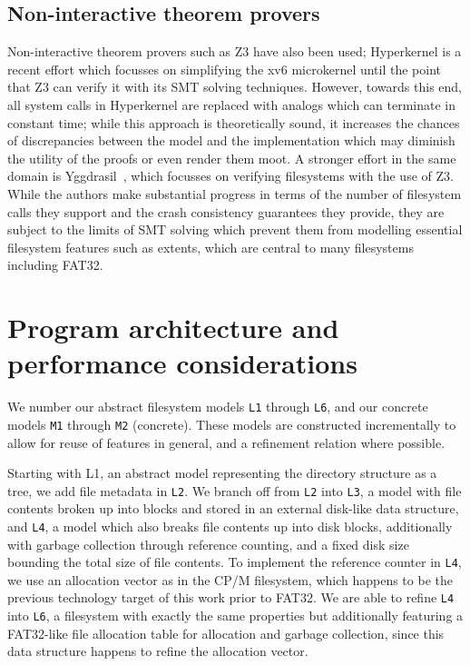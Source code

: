 \documentclass[submission,copyright,creativecommons]{eptcs}
\begin{document}
\subsection{Non-interactive theorem provers}
Non-interactive theorem provers such as Z3 \cite{de2008z3}
have also been used; Hyperkernel
\cite{Nelson:2017:HPV:3132747.3132748} is a recent effort which
focusses on simplifying the xv6 microkernel until the point that Z3
can verify it with its SMT solving techniques. However, towards this
end, all system calls in Hyperkernel are replaced with analogs which
can terminate in constant time; while this approach is theoretically
sound, it increases the chances of discrepancies between the model and
the implementation which may diminish the utility of the proofs or
even render them moot. A stronger effort in the same domain is
Yggdrasil~\cite{sigurbjarnarson2016push}, which focusses on verifying
filesystems with the use of Z3. While the authors make substantial
progress in terms of the number of filesystem calls they support and
the crash consistency guarantees they provide, they are subject to
the limits of SMT solving which prevent them from modelling essential
filesystem features such as extents, which are central to many
filesystems including FAT32.

\section{Program architecture and performance considerations}

We number our abstract filesystem models \texttt{L1} through
\texttt{L6}, and our concrete models \texttt{M1} through \texttt{M2}
(concrete). These models are constructed incrementally to allow for
reuse of features in general, and a refinement relation where
possible.

Starting with L1, an abstract model representing the directory
structure as a tree, we add file
metadata in \texttt{L2}. We branch off from \texttt{L2} into
\texttt{L3}, a model with file contents broken up into blocks and
stored in an external disk-like data structure, and \texttt{L4}, a
model which also breaks file contents up into disk blocks,
additionally with garbage collection through reference counting, and a
fixed disk size bounding the total size of file contents. To implement
the reference counter in \texttt{L4}, we use an allocation vector as
in the CP/M filesystem, which happens to be the previous technology
target of this work prior to FAT32. We are able to refine \texttt{L4}
into \texttt{L6}, a filesystem with exactly the same properties but
additionally featuring a FAT32-like file allocation table for
allocation and garbage collection, since this data structure happens
to refine the allocation vector.
\end{document}
